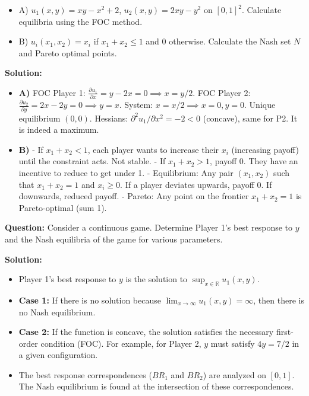 \begin{exemple}[Exam 2023]
\begin{itemize}
    \item A) $u_1(x,y) = xy - x^2 + 2$, $u_2(x,y) = 2xy - y^2$ on $[0,1]^2$. Calculate equilibria using the FOC method.
    \item B) $u_i(x_1, x_2) = x_i$ if $x_1+x_2 \le 1$ and $0$ otherwise. Calculate the Nash set $N$ and Pareto optimal points.
\end{itemize}
\textbf{Solution:}
\begin{itemize}
    \item \textbf{A)} FOC Player 1: $\frac{\partial u_1}{\partial x} = y - 2x = 0 \implies x = y/2$.
    FOC Player 2: $\frac{\partial u_2}{\partial y} = 2x - 2y = 0 \implies y = x$.
    System: $x = x/2 \implies x=0, y=0$. Unique equilibrium $(0,0)$.
    Hessians: $\partial^2 u_1 / \partial x^2 = -2 < 0$ (concave), same for P2. It is indeed a maximum.
    
    \item \textbf{B)} 
    - If $x_1 + x_2 < 1$, each player wants to increase their $x_i$ (increasing payoff) until the constraint acts. Not stable.
    - If $x_1 + x_2 > 1$, payoff 0. They have an incentive to reduce to get under 1.
    - Equilibrium: Any pair $(x_1, x_2)$ such that $x_1 + x_2 = 1$ and $x_i \ge 0$. If a player deviates upwards, payoff 0. If downwards, reduced payoff.
    - Pareto: Any point on the frontier $x_1+x_2=1$ is Pareto-optimal (sum 1).
\end{itemize}
\end{exemple}


\begin{exemple}
\textbf{Question:}
Consider a continuous game. Determine Player 1's best response to $y$ and the Nash equilibria of the game for various parameters.

\textbf{Solution:}
\begin{itemize}
    \item Player 1's best response to $y$ is the solution to $\sup_{x \in \mathbb{R}} u_1(x, y)$.
    \item \textbf{Case 1:} If there is no solution because $\lim_{x \to \infty} u_1(x, y) = \infty$, then there is no Nash equilibrium.
    \item \textbf{Case 2:} If the function is concave, the solution satisfies the necessary first-order condition (FOC). For example, for Player 2, $y$ must satisfy $4y = 7/2$ in a given configuration.
    \item The best response correspondences ($BR_1$ and $BR_2$) are analyzed on $[0, 1]$. The Nash equilibrium is found at the intersection of these correspondences.
\end{itemize}
\end{exemple}

